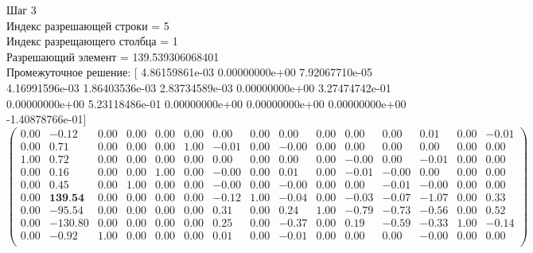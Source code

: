 \documentclass{article}
\begin{document}
\begin{flushleft}
    Шаг 3 \\
Индекс разрешающей строки = 5\\
Индекс разрещающего столбца = 1\\
Разрешающий элемент = 139.539306068401\\
Промежуточное решение:
 [ 4.86159861e-03  0.00000000e+00  7.92067710e-05  4.16991596e-03
  1.86403536e-03  2.83734589e-03  0.00000000e+00  3.27474742e-01
  0.00000000e+00  5.23118486e-01  0.00000000e+00  0.00000000e+00
  0.00000000e+00 -1.40878766e-01]
\begin{equation*}
\begin{pmatrix}
 0.00 &   -0.12 & 0.00 & 0.00 & 0.00 & 0.00 &  0.00 & 0.00 &  0.00 & 0.00 &  0.00 &  0.00 &  0.01 & 0.00 & -0.01 \\
 0.00 &    0.71 & 0.00 & 0.00 & 0.00 & 1.00 & -0.01 & 0.00 & -0.00 & 0.00 &  0.00 &  0.00 &  0.00 & 0.00 &  0.00 \\
 1.00 &    0.72 & 0.00 & 0.00 & 0.00 & 0.00 &  0.00 & 0.00 &  0.00 & 0.00 & -0.00 &  0.00 & -0.01 & 0.00 &  0.00 \\
 0.00 &    0.16 & 0.00 & 0.00 & 1.00 & 0.00 & -0.00 & 0.00 &  0.01 & 0.00 & -0.01 & -0.00 &  0.00 & 0.00 &  0.00 \\
 0.00 &    0.45 & 0.00 & 1.00 & 0.00 & 0.00 & -0.00 & 0.00 & -0.00 & 0.00 &  0.00 & -0.01 & -0.00 & 0.00 &  0.00 \\
 0.00 &  \textbf{139.54} & 0.00 & 0.00 & 0.00 & 0.00 & -0.12 & 1.00 & -0.04 & 0.00 & -0.03 & -0.07 & -1.07 & 0.00 &  0.33 \\
 0.00 &  -95.54 & 0.00 & 0.00 & 0.00 & 0.00 &  0.31 & 0.00 &  0.24 & 1.00 & -0.79 & -0.73 & -0.56 & 0.00 &  0.52 \\
 0.00 & -130.80 & 0.00 & 0.00 & 0.00 & 0.00 &  0.25 & 0.00 & -0.37 & 0.00 &  0.19 & -0.59 & -0.33 & 1.00 & -0.14 \\
 0.00 &   -0.92 & 1.00 & 0.00 & 0.00 & 0.00 &  0.01 & 0.00 & -0.01 & 0.00 &  0.00 &  0.00 & -0.00 & 0.00 &  0.00 \\
\end{pmatrix}
\end{equation*}
\end{flushleft}
\end{document}
